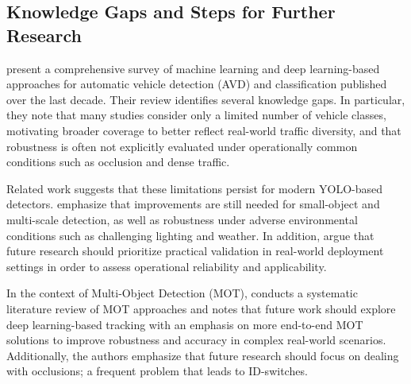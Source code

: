 
\subsection{Knowledge Gaps and Steps for Further Research}
\label{sec:research_gap}

\cite{Maity2022LastDecadeVehicleDetection} present a comprehensive survey of machine learning and deep learning-based approaches for automatic vehicle detection (AVD) and classification published over the last decade. Their review identifies several knowledge gaps. In particular, they note that many studies consider only a limited number of vehicle classes, motivating broader coverage to better reflect real-world traffic diversity, and that robustness is often not explicitly evaluated under operationally common conditions such as occlusion and dense traffic.

Related work suggests that these limitations persist for modern YOLO-based detectors. \cite{DeepLearningTrafficScene2025} emphasize that improvements are still needed for small-object and multi-scale detection, as well as robustness under adverse environmental conditions such as challenging lighting and weather. In addition, \cite{YOLO-PEL} argue that future research should prioritize practical validation in real-world deployment settings in order to assess operational reliability and applicability.

In the context of Multi-Object Detection (MOT), \cite{Hassan2024} conducts a systematic literature review of MOT approaches and notes that future work should explore deep learning-based tracking with an emphasis on more end-to-end MOT solutions to improve robustness and accuracy in complex real-world scenarios. Additionally, the authors emphasize that future research should focus on dealing with occlusions; a frequent problem that leads to ID-switches.

